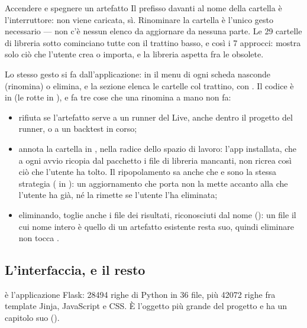 \begin{pratica}{Accendere e spegnere un artefatto}
Il prefisso \cod{\_} davanti al nome della cartella è l'interruttore:
 non viene caricata,  sì.
Rinominare la cartella è l'unico gesto necessario --- non c'è nessun elenco da
aggiornare da nessuna parte. Le \num{29} cartelle di libreria sotto
\pkgStrategie{} cominciano tutte con il trattino basso, e così i \num{7}
approcci:  mostra solo ciò che l'utente crea o importa, e
la libreria aspetta fra le obsolete.

Lo stesso gesto si fa dall'applicazione: in  il menu di
ogni scheda nasconde (rinomina) o elimina, e la sezione
 elenca le cartelle col trattino, con
. Il codice è in 
(le rotte in ), e fa tre cose che una
rinomina a mano non fa:
\begin{itemize}
  \item rifiuta se l'artefatto serve a un runner del Live, anche dentro il
        progetto del runner, o a un backtest in corso;
  \item annota la cartella in , nella radice dello
        spazio di lavoro: l'app installata, che a ogni avvio ricopia dal
        pacchetto i file di libreria mancanti, non ricrea così ciò che
        l'utente ha tolto. Il ripopolamento sa anche che  e
         sono la stessa strategia ( in
        ): un aggiornamento che porta 
        non la mette accanto alla  che l'utente ha già, né la
        rimette se l'utente l'ha eliminata;
  \item eliminando, toglie anche i file dei risultati, riconosciuti dal nome
        (): un file il cui nome intero è
        quello di un artefatto esistente resta suo, quindi eliminare
         non tocca .
\end{itemize}
\end{pratica}

\subsection{L'interfaccia, e il resto}

\pkgDashboard{} è l'applicazione Flask: \num{28494} righe di Python in
\num{36} file, più \num{42072} righe fra template Jinja, JavaScript e CSS. È
l'oggetto più grande del progetto e ha un capitolo suo
().

